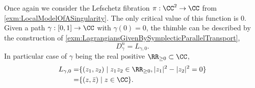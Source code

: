 

    Once again we consider the Lefschetz fibration  $\pi: \CC^2\to \CC$ from \cref{exm:LocalModelOfASingularity}. 
    The only critical value of this function is $0$. 
    Given a path $\gamma:[0, 1]\to \CC$ with $\gamma(0)=0$, the thimble can be described by the construction of \cref{exm:LagrangiansGivenBySymplecticParallelTransport},
    \[D^n_\gamma=L_{\gamma, 0}.\]
    In particular case of $\gamma$ being the real positive $\RR_{\geq0}\subset \CC$,
    \begin{align*}
        L_{\gamma, 0}=&\{(z_1, z_2)\;|\;z_1z_2\in \RR_{\geq 0}, |z_1|^2-|z_2|^2=0\}\\
        =&\{(z, \bar z)\;|\; z\in \CC\}.
    \end{align*}

